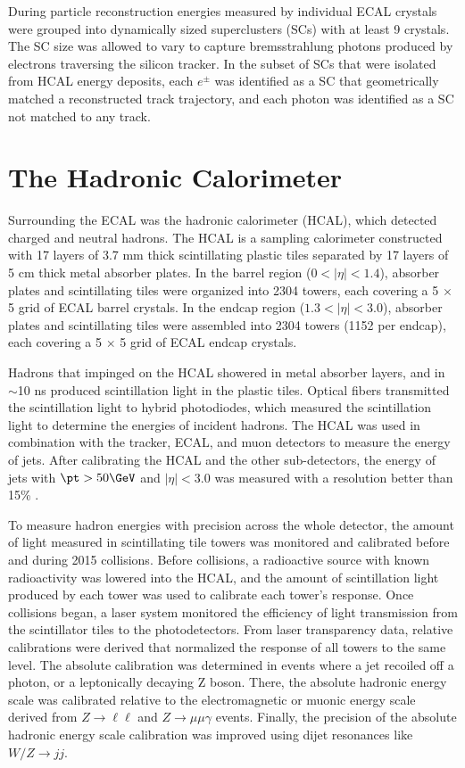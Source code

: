 During particle reconstruction energies measured by individual ECAL crystals were grouped into dynamically 
sized superclusters (SCs) with at least 9 crystals.  The SC size was allowed to vary to capture bremsstrahlung 
photons produced by electrons traversing the silicon tracker.  In the subset of SCs that were isolated 
from HCAL energy deposits, each $e^{\pm}$ was identified as a SC that geometrically matched a reconstructed track 
trajectory, and each photon was identified as a SC not matched to any track.


\section{The Hadronic Calorimeter}
\label{sec:hcalDescription}
Surrounding the ECAL was the hadronic calorimeter (HCAL), which detected charged and neutral hadrons.  The 
HCAL is a sampling calorimeter constructed with 17 layers of 3.7 mm thick scintillating plastic tiles separated by 
17 layers of 5 cm thick metal absorber plates.  In the barrel 
region ($0 < |\eta| < 1.4$), absorber plates and scintillating tiles were organized into 2304 towers, each 
covering a 5 $\times$ 5 grid of ECAL barrel crystals.  In the endcap region ($1.3 < |\eta| < 3.0$), absorber 
plates and scintillating tiles were assembled into 2304 towers (1152 per endcap), each covering 
a 5 $\times$ 5 grid of ECAL endcap crystals.

Hadrons that impinged on the HCAL showered in metal absorber layers, and in $\sim$10 ns produced scintillation 
light in the plastic tiles.  Optical fibers transmitted the scintillation light to hybrid photodiodes, 
which measured the scintillation light to determine the energies of incident hadrons.  The HCAL was used in 
combination with the tracker, ECAL, and muon detectors to measure the energy of jets.  After calibrating the 
HCAL and the other sub-detectors, the energy of jets with $\pt > 50\GeV$ and $|\eta| < 3.0$ was measured with 
a resolution better than 15\% \cite{jetResolutionInCollisions}.

To measure hadron energies with precision across the whole detector, the amount of light measured in scintillating tile towers 
was monitored and calibrated before and during 2015 collisions.  Before collisions, a radioactive source 
with known radioactivity was lowered into the HCAL, and the amount of scintillation light produced by each 
tower was used to calibrate each tower's response.  Once collisions began, a laser system 
monitored the efficiency of light transmission from the scintillator tiles to the photodetectors.  
From laser transparency data, relative calibrations were derived that normalized the response of all towers 
to the same level.  The absolute 
calibration was determined in events where a jet recoiled off a photon, or a leptonically decaying Z boson.  
There, the absolute hadronic energy 
scale was calibrated relative to the electromagnetic or muonic energy scale derived from $Z \rightarrow \ell\ell$ 
and $Z \rightarrow \mu\mu\gamma$ events.  Finally, the precision of the absolute hadronic energy scale calibration 
was improved using dijet resonances like $W/Z \rightarrow jj$.

